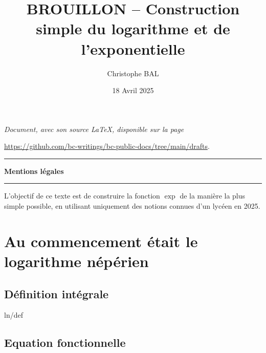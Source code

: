 \documentclass[12pt]{amsart}
\begin{document}
\title{BROUILLON -- Construction simple du logarithme et de l'exponentielle}
\author{Christophe BAL}
\date{18 Avril 2025}

\maketitle

\begin{center}
	\itshape
	Document, avec son source \LaTeX, disponible sur la page

	\url{https://github.com/bc-writings/bc-public-docs/tree/main/drafts}.
\end{center}


\bigskip


\begin{center}
	\hrule\vspace{.3em}
	{
		\fontsize{1.35em}{1em}\selectfont
		\textbf{Mentions \og légales \fg}
	}

	\vspace{0.45em}
	\doclicenseThis
	\hrule
\end{center}


\bigskip


\setcounter{tocdepth}{2}
\tableofcontents




\newpage

\begin{meta-abstract*}
	L’objectif de ce texte est de construire la fonction $\exp$ de la manière la plus simple possible, en utilisant uniquement des notions connues d'un lycéen en 2025.
\end{meta-abstract*}




\section{Au commencement était le logarithme népérien}

	\subsection{Définition intégrale}

	{ln/def}


	\subsection{Equation fonctionnelle}
\end{document}
